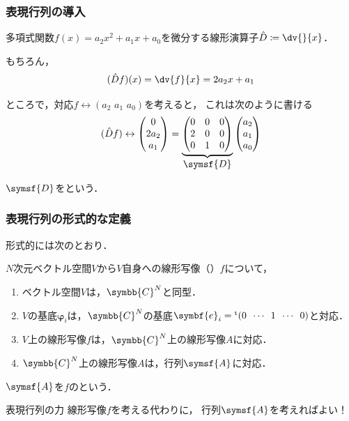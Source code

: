\documentclass[
    10pt,
    ]{sotsu-beamer}
\begin{document}
\begin{frame}
    \frametitle{表現行列の導入}

    多項式関数$f(x) = a_2 x^2 + a_1 x + a_0$を微分する線形演算子$\hat{D} \coloneq \dv{}{x}$．

    もちろん，
    \begin{equation*}
        (\hat{D} f) (x) = \dv{f}{x} = 2 a_2 x + a_1
    \end{equation*}

    \pause

    ところで，対応$f \leftrightarrow (a_2 \,\, a_1 \,\, a_0)$を考えると，
    これは次のように書ける
    \begin{equation*}
        (\hat{D} f)
        \leftrightarrow
        \begin{pmatrix}
            0  \\  2 a_2  \\  a_1
        \end{pmatrix}
        =
        \underbrace{
        \begin{pmatrix}
            0  &  0  &  0  \\
            2  &  0  &  0  \\
            0  &  1  &  0
        \end{pmatrix}
        }_{\text{\normalsize$\symsf{D}$}}
        \begin{pmatrix}
            a_2  \\  a_1  \\  a_0
        \end{pmatrix}
    \end{equation*}

    \pause

    $\symsf{D}$をという．

\end{frame}


\begin{frame}
    \frametitle{表現行列の形式的な定義}

    形式的には次のとおり．

    $N$次元ベクトル空間$V$から$V$自身への線形写像（）$f$について，
    \begin{enumerate}
        \item ベクトル空間$V$は，$\symbb{C}^N$と同型．
        \item $V$の基底$\symbf{\varphi}_i$は，$\symbb{C}^N$の基底$\symbf{e}_i = \cvector{0 ; \cdots ; 1 ; \cdots ; 0}$と対応．
        \item $V$上の線形写像$f$は，$\symbb{C}^N$上の線形写像$A$に対応．
        \item $\symbb{C}^N$上の線形写像$A$は，行列$\symsf{A}$に対応．
    \end{enumerate}
    $\symsf{A}$を$f$のという．

    \pause

    \begin{alertblock}{表現行列の力}
        線形写像$f$を考える代わりに，
        行列$\symsf{A}$を考えればよい！
    \end{alertblock}

\end{frame}
\end{document}
